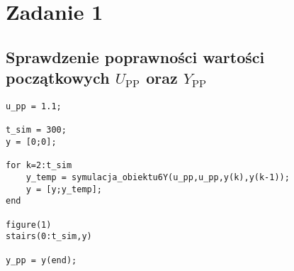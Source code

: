 \chapter{Zadanie 1}

\section{Sprawdzenie poprawności wartości początkowych $U_{\textrm{PP}}$ oraz $Y_{\textrm{PP}}$}

\begin{lstlisting}[style=Matlab-editor]
%wyznaczanie y_pp dla u_pp = 1.1
u_pp = 1.1;

t_sim = 300;
y = [0;0];

for k=2:t_sim
    y_temp = symulacja_obiektu6Y(u_pp,u_pp,y(k),y(k-1));
    y = [y;y_temp];
end

figure(1)
stairs(0:t_sim,y)

y_pp = y(end);
\end{lstlisting}